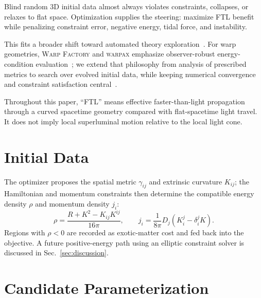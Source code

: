 \documentclass[twocolumn,floatfix,aps,prd,nofootinbib]{revtex4-2}
\begin{document}
Blind random 3D initial data almost always violates constraints, collapses, or relaxes to flat space.  Optimization supplies the steering: maximize FTL benefit while penalizing constraint error, negative energy, tidal force, and instability.

This fits a broader shift toward automated theory exploration~\cite{alexander2026albert,halverson2019branes,qiu2026collideragent,han2025physagent}.  For warp geometries, \textsc{Warp Factory} and \textsc{warpax} emphasize observer-robust energy-condition evaluation~\cite{helmerich2024warpfactory,le2026warpax}; we extend that philosophy from analysis of prescribed metrics to search over evolved initial data, while keeping numerical convergence and constraint satisfaction central~\cite{lousto2006fourth,li2023pinn}.

Throughout this paper, ``FTL'' means effective faster-than-light propagation through a curved spacetime geometry compared with flat-spacetime light travel.  It does not imply local superluminal motion relative to the local light cone.

\section{Initial Data}

The optimizer proposes the spatial metric $\gamma_{ij}$ and extrinsic curvature $K_{ij}$; the Hamiltonian and momentum constraints then determine the compatible energy density $\rho$ and momentum density $j_i$:
\begin{equation}
    \rho = \frac{R + K^2 - K_{ij}K^{ij}}{16\pi},\qquad
    j_i = \frac{1}{8\pi} D_j\!\left(K^j_i - \delta^j_i K\right).
\end{equation}
Regions with $\rho<0$ are recorded as exotic-matter cost and fed back into the objective.  A future positive-energy path using an elliptic constraint solver is discussed in Sec.~\ref{sec:discussion}.

\section{Candidate Parameterization}
\end{document}
